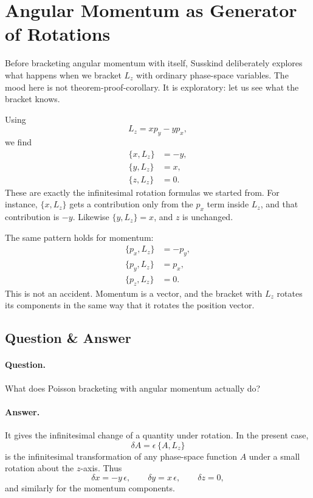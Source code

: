 \section{Angular Momentum as Generator of Rotations}

Before bracketing angular momentum with itself, Susskind deliberately explores what happens when we bracket \(L_z\) with ordinary phase-space variables. The mood here is not theorem-proof-corollary. It is exploratory: let us see what the bracket knows.

Using
\[
L_z=xp_y-yp_x,
\]
we find
\begin{align}
\{x,L_z\}&=-y,\\
\{y,L_z\}&=x,\\
\{z,L_z\}&=0.
\end{align}
These are exactly the infinitesimal rotation formulas we started from. For instance, \(\{x,L_z\}\) gets a contribution only from the \(p_x\) term inside \(L_z\), and that contribution is \(-y\). Likewise \(\{y,L_z\}=x\), and \(z\) is unchanged.

The same pattern holds for momentum:
\begin{align}
\{p_x,L_z\}&=-p_y,\\
\{p_y,L_z\}&=p_x,\\
\{p_z,L_z\}&=0.
\end{align}
This is not an accident. Momentum is a vector, and the bracket with \(L_z\) rotates its components in the same way that it rotates the position vector.

\subsection{Question \& Answer}

\paragraph{Question.} What does Poisson bracketing with angular momentum actually do?

\paragraph{Answer.} It gives the infinitesimal change of a quantity under rotation. In the present case,
\begin{equation}
\delta A=\epsilon\,\{A,L_z\}
\end{equation}
is the infinitesimal transformation of any phase-space function \(A\) under a small rotation about the \(z\)-axis. Thus
\[
\delta x=-y\,\epsilon,\qquad \delta y=x\,\epsilon,\qquad \delta z=0,
\]
and similarly for the momentum components.

